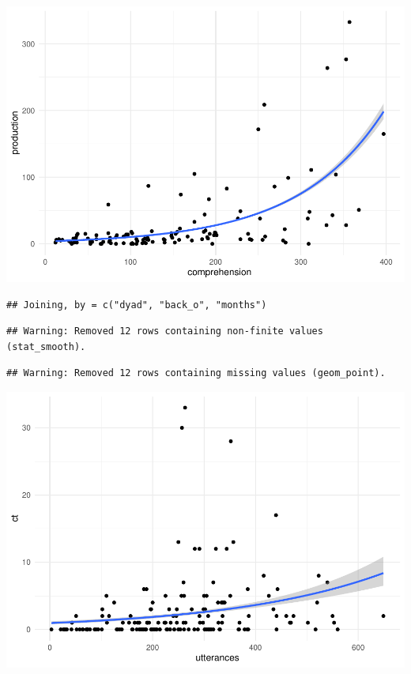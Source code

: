 \documentclass[]{article}
\newenvironment{Shaded}{\begin{snugshade}}{\end{snugshade}}
\newcommand{\DataTypeTok}[1]{\textcolor[rgb]{0.13,0.29,0.53}{#1}}
\newcommand{\KeywordTok}[1]{\textcolor[rgb]{0.13,0.29,0.53}{\textbf{#1}}}
\newcommand{\NormalTok}[1]{#1}
\newcommand{\OperatorTok}[1]{\textcolor[rgb]{0.81,0.36,0.00}{\textbf{#1}}}
\newcommand{\StringTok}[1]{\textcolor[rgb]{0.31,0.60,0.02}{#1}}
\begin{document}
\includegraphics{supplement_files/figure-latex/vocab-cor-1.pdf}

\begin{Shaded}
\end{Shaded}

\begin{verbatim}
## Joining, by = c("dyad", "back_o", "months")
\end{verbatim}

\begin{verbatim}
## Warning: Removed 12 rows containing non-finite values (stat_smooth).
\end{verbatim}

\begin{verbatim}
## Warning: Removed 12 rows containing missing values (geom_point).
\end{verbatim}

\includegraphics{supplement_files/figure-latex/maternal-cor-1.pdf}
\end{document}
